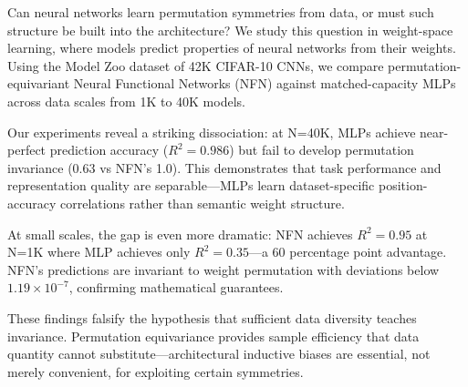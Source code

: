 Can neural networks learn permutation symmetries from data, or must such structure be built into the architecture? We study this question in weight-space learning, where models predict properties of neural networks from their weights. Using the Model Zoo dataset of 42K CIFAR-10 CNNs, we compare permutation-equivariant Neural Functional Networks (NFN) against matched-capacity MLPs across data scales from 1K to 40K models.

Our experiments reveal a striking dissociation: at N=40K, MLPs achieve near-perfect prediction accuracy ($R^2=0.986$) but fail to develop permutation invariance (0.63 vs NFN's 1.0). This demonstrates that task performance and representation quality are separable---MLPs learn dataset-specific position-accuracy correlations rather than semantic weight structure.

At small scales, the gap is even more dramatic: NFN achieves $R^2=0.95$ at N=1K where MLP achieves only $R^2=0.35$---a 60 percentage point advantage. NFN's predictions are invariant to weight permutation with deviations below $1.19 \times 10^{-7}$, confirming mathematical guarantees.

These findings falsify the hypothesis that sufficient data diversity teaches invariance. Permutation equivariance provides sample efficiency that data quantity cannot substitute---architectural inductive biases are essential, not merely convenient, for exploiting certain symmetries.
